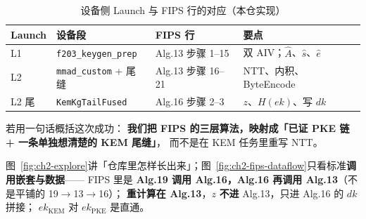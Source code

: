 \documentclass[UTF8,a4paper,11pt]{ctexart}
\theoremstyle{definition}
\theoremstyle{plain}
\theoremstyle{remark}
\numberwithin{figure}{section}
\numberwithin{table}{section}
\begin{document}
\begin{table}[H]
\centering\small
\caption{设备侧 Launch 与 FIPS 行的对应（本仓实现）}
\label{tab:ch2-launch}
\begin{tabular}{@{}L{2.0cm}L{5.5cm}L{2.2cm}L{4.0cm}@{}}
  \toprule
  Launch & 设备段 & FIPS 行 & 要点 \\
  \midrule
  L1 & \texttt{f203\_keygen\_prep} & Alg.13 步骤 1--15 & 双 AIV；$\hat{A}$、$\hat{s}$、$\hat{e}$ \\
  L2 & \texttt{mmad\_custom} + 尾缝 & Alg.13 步骤 16--21 & NTT、内积、ByteEncode \\
  L2 尾 & \texttt{KemKgTailFused} & Alg.16 步骤 2--3 & $z$、$H(\mathit{ek})$、写 $\mathit{dk}$ \\
  \bottomrule
\end{tabular}
\end{table}

若用一句话概括这次成功：
\textbf{我们把 FIPS 的三层算法，映射成「已证 PKE 链 + 一条单独想清楚的 KEM 尾缝」}，
而不是在 KEM 任务里重写 NTT。

图~\ref{fig:ch2-explore}讲「仓库里怎样长出来」；图~\ref{fig:ch2-fips-dataflow}只看标准\textbf{调用嵌套与数据}——
FIPS 里是 \textbf{Alg.19 调用 Alg.16，Alg.16 再调用 Alg.13}（不是平铺的 19$\to$13$\to$16）；
\textbf{重计算在 Alg.13}，$z$ \textbf{不进} Alg.13，只进 Alg.16 的 $\mathit{dk}$ 拼接；
$\mathit{ek}_{\mathrm{KEM}}$ 对 $\mathit{ek}_{\mathrm{PKE}}$ 是直通。
\end{document}
